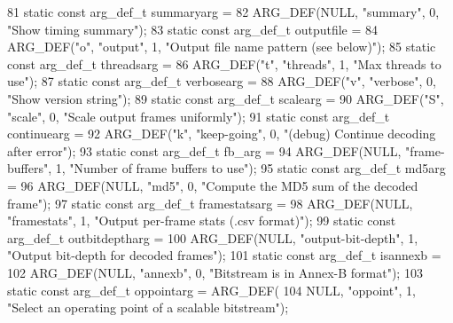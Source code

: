 \begin{DoxyCodeInclude}
81 \textcolor{keyword}{static} \textcolor{keyword}{const} arg\_def\_t summaryarg =
82     ARG\_DEF(NULL, \textcolor{stringliteral}{"summary"}, 0, \textcolor{stringliteral}{"Show timing summary"});
83 \textcolor{keyword}{static} \textcolor{keyword}{const} arg\_def\_t outputfile =
84     ARG\_DEF(\textcolor{stringliteral}{"o"}, \textcolor{stringliteral}{"output"}, 1, \textcolor{stringliteral}{"Output file name pattern (see below)"});
85 \textcolor{keyword}{static} \textcolor{keyword}{const} arg\_def\_t threadsarg =
86     ARG\_DEF(\textcolor{stringliteral}{"t"}, \textcolor{stringliteral}{"threads"}, 1, \textcolor{stringliteral}{"Max threads to use"});
87 \textcolor{keyword}{static} \textcolor{keyword}{const} arg\_def\_t verbosearg =
88     ARG\_DEF(\textcolor{stringliteral}{"v"}, \textcolor{stringliteral}{"verbose"}, 0, \textcolor{stringliteral}{"Show version string"});
89 \textcolor{keyword}{static} \textcolor{keyword}{const} arg\_def\_t scalearg =
90     ARG\_DEF(\textcolor{stringliteral}{"S"}, \textcolor{stringliteral}{"scale"}, 0, \textcolor{stringliteral}{"Scale output frames uniformly"});
91 \textcolor{keyword}{static} \textcolor{keyword}{const} arg\_def\_t continuearg =
92     ARG\_DEF(\textcolor{stringliteral}{"k"}, \textcolor{stringliteral}{"keep-going"}, 0, \textcolor{stringliteral}{"(debug) Continue decoding after error"});
93 \textcolor{keyword}{static} \textcolor{keyword}{const} arg\_def\_t fb\_arg =
94     ARG\_DEF(NULL, \textcolor{stringliteral}{"frame-buffers"}, 1, \textcolor{stringliteral}{"Number of frame buffers to use"});
95 \textcolor{keyword}{static} \textcolor{keyword}{const} arg\_def\_t md5arg =
96     ARG\_DEF(NULL, \textcolor{stringliteral}{"md5"}, 0, \textcolor{stringliteral}{"Compute the MD5 sum of the decoded frame"});
97 \textcolor{keyword}{static} \textcolor{keyword}{const} arg\_def\_t framestatsarg =
98     ARG\_DEF(NULL, \textcolor{stringliteral}{"framestats"}, 1, \textcolor{stringliteral}{"Output per-frame stats (.csv format)"});
99 \textcolor{keyword}{static} \textcolor{keyword}{const} arg\_def\_t outbitdeptharg =
100     ARG\_DEF(NULL, \textcolor{stringliteral}{"output-bit-depth"}, 1, \textcolor{stringliteral}{"Output bit-depth for decoded frames"});
101 \textcolor{keyword}{static} \textcolor{keyword}{const} arg\_def\_t isannexb =
102     ARG\_DEF(NULL, \textcolor{stringliteral}{"annexb"}, 0, \textcolor{stringliteral}{"Bitstream is in Annex-B format"});
103 \textcolor{keyword}{static} \textcolor{keyword}{const} arg\_def\_t oppointarg = ARG\_DEF(
104     NULL, \textcolor{stringliteral}{"oppoint"}, 1, \textcolor{stringliteral}{"Select an operating point of a scalable bitstream"});

\end{DoxyCodeInclude}
